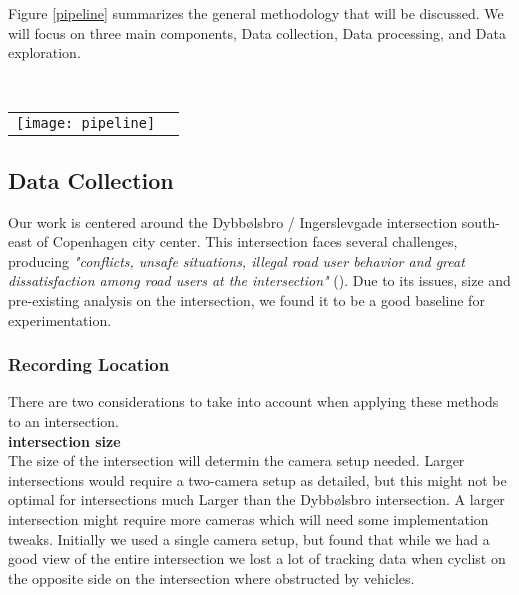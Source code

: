 
Figure \ref{pipeline} summarizes the general methodology that will be discussed. We will focus
on three main components, Data collection, Data processing, and Data exploration.

\ \\ 
\noindent
\begin{tabular}{@{}cc}
\texttt{[image: pipeline]} 
\end{tabular}
\label{pipeline}

\subsection{Data Collection}
Our work is centered around the Dybbølsbro / Ingerslevgade intersection south-east of Copenhagen
city center. This intersection faces several challenges, producing \textit{"conflicts, unsafe situations, illegal 
road user behavior and great dissatisfaction among road users at the intersection"} (\cite{CPHpost_2021}).
Due to its issues, size and pre-existing analysis on the intersection, we found it to be a good baseline
for experimentation.

\subsubsection{Recording Location}

There are two considerations to take into account when applying these methods to an intersection.
\ \\

\textbf{intersection size} \\
The size of the intersection will determin the camera setup needed. Larger intersections would require a two-camera setup as detailed, but this might not be optimal for intersections much Larger
than the Dybbølsbro intersection. A larger intersection might require more cameras which will need some implementation tweaks. Initially we used a single camera setup, but found that
while we had a good view of the entire intersection we lost a lot of tracking data when cyclist on the opposite side on the intersection where obstructed by vehicles.
\ \\

